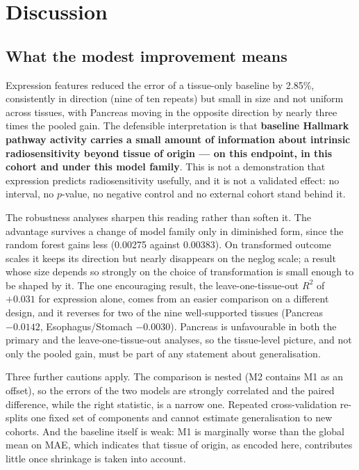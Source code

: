 \chapter{Discussion}\label{ch:discussion}

\section{What the modest improvement means}

Expression features reduced the error of a tissue-only baseline by 2.85\%, consistently in
direction (nine of ten repeats) but small in size and not uniform across tissues, with
Pancreas moving in the opposite direction by nearly three times the pooled gain. The
defensible interpretation is that \textbf{baseline Hallmark pathway activity carries a small
amount of information about intrinsic radiosensitivity beyond tissue of origin --- on this
endpoint, in this cohort and under this model family}. This is not a demonstration that
expression predicts radiosensitivity usefully, and it is not a validated effect: no interval,
no $p$-value, no negative control and no external cohort stand behind it.

The robustness analyses sharpen this reading rather than soften it. The advantage survives a
change of model family only in diminished form, since the random forest gains less (0.00275
against 0.00383). On transformed outcome scales it keeps its direction but nearly disappears
on the neglog scale; a result whose size depends so strongly on the choice of transformation
is small enough to be shaped by it. The one encouraging result, the leave-one-tissue-out
$R^2$ of $+0.031$ for expression alone, comes from an easier comparison on a different design,
and it reverses for two of the nine well-supported tissues (Pancreas $-0.0142$,
Esophagus/Stomach $-0.0030$). Pancreas is unfavourable in both the primary and the
leave-one-tissue-out analyses, so the tissue-level picture, and not only the pooled gain,
must be part of any statement about generalisation.

Three further cautions apply. The comparison is nested (M2 contains M1 as an offset), so the
errors of the two models are strongly correlated and the paired difference, while the right
statistic, is a narrow one. Repeated cross-validation re-splits one fixed set of components
and cannot estimate generalisation to new cohorts. And the baseline itself is weak: M1 is
marginally worse than the global mean on MAE, which indicates that tissue of origin, as
encoded here, contributes little once shrinkage is taken into account.

